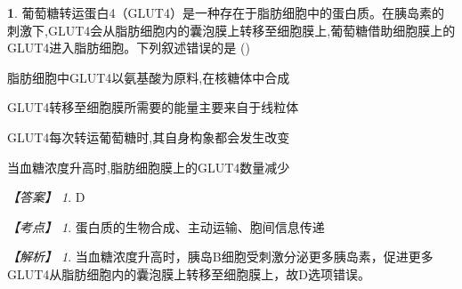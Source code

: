 \documentclass[UTF8, 10pt, a4paper, oneside]{ctexart}
\theoremstyle{definition}
\newtheorem{exercise}{}
\theoremstyle{remark}
\newtheorem*{answer}{【答案】}
\newtheorem*{point}{【考点】}      %
\newtheorem*{explanation}{【解析】}     %
\theoremstyle{plain}
\begin{document}
\begin{exercise}
    葡萄糖转运蛋白4（GLUT4）是一种存在于脂肪细胞中的蛋白质。在胰岛素的刺激下,GLUT4会从脂肪细胞内的囊泡膜上转移至细胞膜上,葡萄糖借助细胞膜上的GLUT4进入脂肪细胞。下列叙述错误的是 \quad(\quad)
    \begin{adjustwidth}{2em}{}
        \begin{asparaenum}[A. ]
            \item 脂肪细胞中GLUT4以氨基酸为原料,在核糖体中合成
            \item GLUT4转移至细胞膜所需要的能量主要来自于线粒体
            \item GLUT4每次转运葡萄糖时,其自身构象都会发生改变
            \item 当血糖浓度升高时,脂肪细胞膜上的GLUT4数量减少
        \end{asparaenum}
    \end{adjustwidth}
    \begin{answer}
        D
    \end{answer}
    \begin{point}
        蛋白质的生物合成、主动运输、胞间信息传递
    \end{point}
    \begin{explanation}
        当血糖浓度升高时，胰岛B细胞受刺激分泌更多胰岛素，促进更多GLUT4从脂肪细胞内的囊泡膜上转移至细胞膜上，故D选项错误。
    \end{explanation}
\end{exercise}
\end{document}
